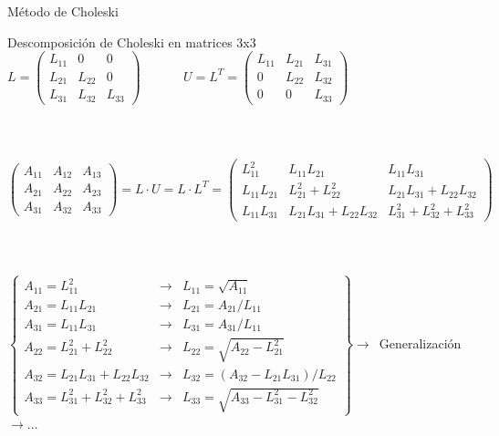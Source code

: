 \documentclass [8pt] {beamer}
\begin{document}
        \begin{frame}{Método de Choleski}
            \begin{block}{Descomposición de Choleski en matrices 3x3}
                {$L = \left(\begin{array}{ccc}
                L_{11} & 0 & 0\\
                L_{21} & L_{22} & 0\\
                L_{31} & L_{32} & L_{33}
                \end{array}\right) \ \ \ \ \ \ \ \ \ \ \ \ \ \ \ U = L^T = \left(\begin{array}{ccc}
                L_{11} & L_{21} & L_{31}\\
                0 & L_{22} & L_{32}\\
                0 & 0 & L_{33}
                \end{array}\right)$} \\ \ \\ \ \\ \ \\
                {$\left(\begin{array}{ccc}
                A_{11} & A_{12} & A_{13}\\
                A_{21} & A_{22} & A_{23}\\
                A_{31} & A_{32} & A_{33}
                \end{array}\right) = L \cdot U = L \cdot L^T =  \left(\begin{array}{ccc}
                L^2_{11} & L_{11} L_{21} & L_{11} L_{31}\\
                L_{11} L_{21} & L^2_{21} + L^2_{22} & L_{21} L_{31} + L_{22} L_{32}\\
                L_{11} L_{31} & L_{21} L_{31} + L_{22} L_{32} & L^2_{31} + L^2_{32} +
                L^2_{33}
                \end{array}\right)$} \\ \ \\ \ \\ \ \\ 
                {$ \left\{ \begin{array}{lll}
                A_{11} = L^2_{11} & \rightarrow & L_{11} = \sqrt{A_{11}}\\
                A_{21} = L_{11} L_{21} & \rightarrow & L_{21} = A_{21} / L_{11}\\
                A_{31} = L_{11} L_{31} & \rightarrow & L_{31} = A_{31} / L_{11}\\
                A_{22} = L^2_{21} + L^2_{22} & \rightarrow & L_{22} = \sqrt{A_{22} - L^2_{21}}\\
                A_{32} = L_{21} L_{31} + L_{22} L_{32} & \rightarrow & L_{32} = ( A_{32} - L_{21} L_{31}) / L_{22}\\
                A_{33} = L^2_{31} + L^2_{32} + L^2_{33} & \rightarrow & L_{33} = \sqrt{A_{33} - L^2_{31^{}} - L^2_{32}}
                \end{array} \right\} \rightarrow ${\ Generalización}$ \rightarrow \ldots $} 
            \end{block}
        \end{frame}
\end{document}
